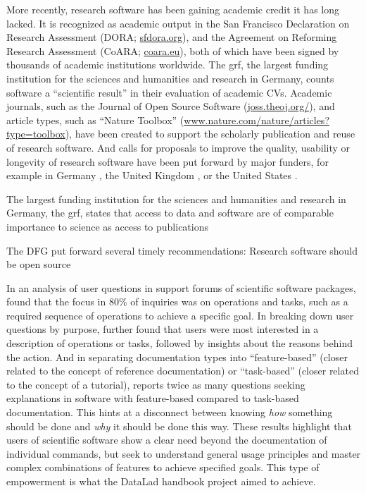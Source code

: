 More recently, research software has been gaining academic credit it has long lacked.
It is recognized as academic output in the San Francisco Declaration on Research Assessment (DORA; \href{https://sfdora.org/}{sfdora.org}), and the Agreement on Reforming Research Assessment (CoARA; \href{https://coara.eu}{coara.eu}), both of which have been signed by thousands of academic institutions worldwide. The \gls{grf}, the largest funding institution for the sciences and humanities and research in Germany, counts software a ``scientific result'' in their evaluation of academic CVs.
Academic journals, such as the Journal of Open Source Software (\href{https://joss.theoj.org/}{joss.theoj.org/}), and article types, such as ``Nature Toolbox'' (\href{https://www.nature.com/nature/articles?type=toolbox}{www.nature.com/nature/articles?type=toolbox}), have been created to support the scholarly publication and reuse of research software.
And calls for proposals to improve the quality, usability or longevity of research software have been put forward by major funders, for example in Germany \citep{dfgrs}, the United Kingdom \citep{ukri}, or the United States \citep{nih}.



The largest funding institution for the sciences and humanities and research in Germany, the \gls{grf}, states that access to data and software are of comparable importance to science as access to publications \citep{dfg}

The DFG put forward several timely recommendations: Research software should be open source \citep{dfg}


In an analysis of user questions in support forums of scientific software packages, \citet{swarts2019open} found that the focus in 80\% of inquiries was on operations and tasks, such as a required sequence of operations to achieve a specific goal.
In breaking down user questions by purpose, \citet{swarts2019open} further found that users were most interested in a description of operations or tasks, followed by insights about the reasons behind the action.
And in separating documentation types into ``feature-based'' (closer related to the concept of reference documentation) or ``task-based'' (closer related to the concept of a tutorial),  \citet{swarts2019open} reports twice as many questions seeking explanations in software with feature-based compared to task-based documentation.
This hints at a disconnect between knowing \textit{how} something should be done and \textit{why} it should be done this way.
These results highlight that users of scientific software show a clear need beyond the documentation of individual commands, but seek to understand general usage principles and master complex combinations of features to achieve specified goals.
This type of empowerment is what the DataLad handbook project aimed to achieve.


